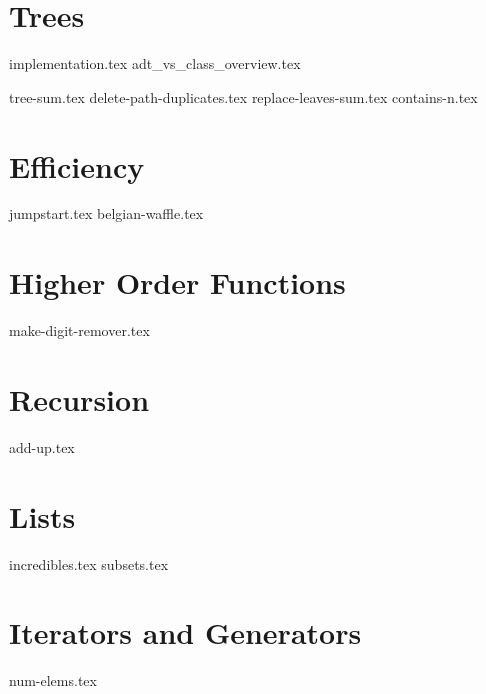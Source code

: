 \documentclass{exam}
\begin{document}
\section{Trees}
{implementation.tex}
{adt_vs_class_overview.tex}
\begin{questions}
    {tree-sum.tex}
    \newpage
    {delete-path-duplicates.tex}
    \newpage
    {replace-leaves-sum.tex}
    {contains-n.tex}
\end{questions}

\section{Efficiency}
\begin{questions}
    {jumpstart.tex}
    {belgian-waffle.tex}
\end{questions}

\section{Higher Order Functions}
\begin{questions}
    {make-digit-remover.tex}
\end{questions}

\section{Recursion}
\begin{questions}
    {add-up.tex}
\end{questions}

\section{Lists}
\begin{questions}
    {incredibles.tex}
    {subsets.tex}
\end{questions}

\newpage

\section{Iterators and Generators}
\begin{questions}
    {num-elems.tex}
\end{questions}
\end{document}
